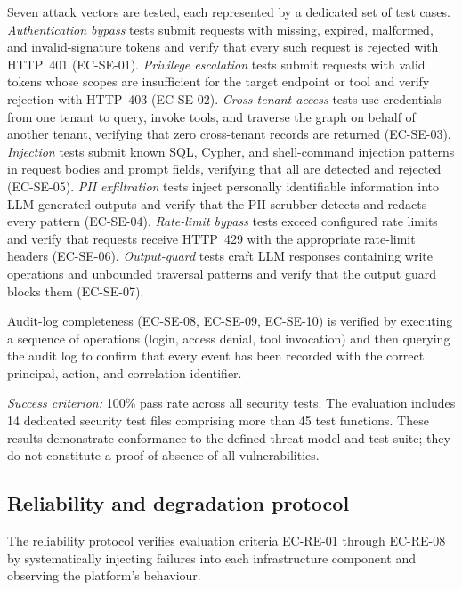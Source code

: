 \documentclass[a4paper]{sapthesis}
\begin{document}
Seven attack vectors are tested, each represented by a dedicated set
of test cases.  \emph{Authentication bypass} tests submit requests with
missing, expired, malformed, and invalid-signature tokens and verify that
every such request is rejected with HTTP~401 (EC-SE-01).
\emph{Privilege escalation} tests submit requests with valid tokens whose
scopes are insufficient for the target endpoint or tool and verify
rejection with HTTP~403 (EC-SE-02).  \emph{Cross-tenant access} tests
use credentials from one tenant to query, invoke tools, and traverse the
graph on behalf of another tenant, verifying that zero cross-tenant
records are returned (EC-SE-03).  \emph{Injection} tests submit known SQL,
Cypher, and shell-command injection patterns in request bodies and prompt
fields, verifying that all are detected and rejected (EC-SE-05).
\emph{PII exfiltration} tests inject personally identifiable information
into LLM-generated outputs and verify that the PII scrubber detects and
redacts every pattern (EC-SE-04).  \emph{Rate-limit bypass} tests exceed
configured rate limits and verify that requests receive HTTP~429 with the
appropriate rate-limit headers (EC-SE-06).  \emph{Output-guard} tests
craft LLM responses containing write operations and unbounded traversal
patterns and verify that the output guard blocks them (EC-SE-07).

Audit-log completeness (EC-SE-08, EC-SE-09, EC-SE-10) is verified by
executing a sequence of operations (login, access denial, tool
invocation) and then querying the audit log to confirm that every event
has been recorded with the correct principal, action, and correlation
identifier.

\medskip
\noindent\emph{Success criterion:} 100\% pass rate across all security
tests.  The evaluation includes 14 dedicated security test files
comprising more than 45 test functions.  These results demonstrate
conformance to the defined threat model and test suite; they do not
constitute a proof of absence of all vulnerabilities.

\subsection{Reliability and degradation protocol}
\label{sec:reliability-protocol}

The reliability protocol verifies evaluation criteria EC-RE-01 through
EC-RE-08 by systematically injecting failures into each infrastructure
component and observing the platform's behaviour.
\end{document}
